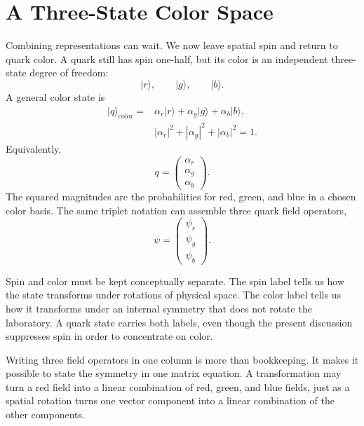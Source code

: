 \section{A Three-State Color Space}

Combining representations can wait. We now leave spatial spin and return to
quark color. A quark still has spin one-half, but its color is an independent
three-state degree of freedom:
\begin{equation}
\lvert r\rangle,\qquad
\lvert g\rangle,\qquad
\lvert b\rangle.
\end{equation}
A general color state is
\begin{equation}
\begin{aligned}
\lvert q\rangle_{\mathrm{color}}
={}&
\alpha_r\lvert r\rangle
+\alpha_g\lvert g\rangle
+\alpha_b\lvert b\rangle,
\\
&|\alpha_r|^2+|\alpha_g|^2+|\alpha_b|^2=1.
\end{aligned}
\end{equation}
Equivalently,
\begin{equation}
q=
\begin{pmatrix}
\alpha_r\\
\alpha_g\\
\alpha_b
\end{pmatrix}.
\end{equation}
The squared magnitudes are the probabilities for red, green, and blue in a
chosen color basis. The same triplet notation can assemble three quark field
operators,
\begin{equation}
\psi=
\begin{pmatrix}
\psi_r\\
\psi_g\\
\psi_b
\end{pmatrix}.
\end{equation}

Spin and color must be kept conceptually separate. The spin label tells us how
the state transforms under rotations of physical space. The color label tells
us how it transforms under an internal symmetry that does not rotate the
laboratory. A quark state carries both labels, even though the present
discussion suppresses spin in order to concentrate on color.

Writing three field operators in one column is more than bookkeeping. It makes
it possible to state the symmetry in one matrix equation. A transformation
may turn a red field into a linear combination of red, green, and blue fields,
just as a spatial rotation turns one vector component into a linear
combination of the other components.

